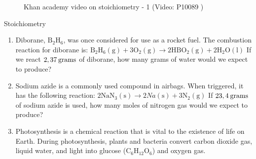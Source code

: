    \noindent
\label{m38712*eip-546}
    \setcounter{subfigure}{0}
	\begin{figure}[H] %
    \textnormal{Khan academy video on stoichiometry - 1}\vspace{.1in} \nopagebreak
  \label{m38712*yt-media4}\label{m38712*yt-video4}
             { (Video:  P10089 )}
      \vspace{2pt}
    \vspace{.1in}
 \end{figure}       \par \label{m38712*secfhsst!!!underscore!!!id2276}
            \begin{exercises}{  Stoichiometry
      }
            \nopagebreak
      \label{m38712*id285393}\begin{enumerate}[noitemsep, label=\textbf{\arabic*}. ] 
            \label{m38712*uid101}\item Diborane, $\mathrm{B}{}_{2}\mathrm{H}{}_{6}$, was once considered for use as a rocket fuel. The combustion reaction for diborane is:
${\mathrm{B}}_{2}{\mathrm{H}}_{6}\left(\mathrm{g}\right)+3{\mathrm{O}}_{2}\left(\mathrm{g}\right)\to 2\mathrm{H}\mathrm{B}{\mathrm{O}}_{2}\left(\mathrm{g}\right)+2{\mathrm{H}}_{2}\mathrm{O}\left(\mathrm{l}\right)$
If we react $2,37\phantom{\rule{2pt}{0ex}}\mathrm{grams}$ of diborane, how many grams of water would we expect to produce?\newline
\label{m38712*uid102}\item Sodium azide is a commonly used compound in airbags. When triggered, it has the following reaction:
$2{\mathrm{NaN}}_{3}\left(\mathrm{s}\right)\to 2Na\left(\mathrm{s}\right)+3{\mathrm{N}}_{2}\left(\mathrm{g}\right)$
If $23,4\phantom{\rule{2pt}{0ex}}\mathrm{grams}$ of sodium azide is used, how many moles of nitrogen gas would we expect to produce?\newline
\label{m38712*uid103}\item Photosynthesis is a chemical reaction that is vital to the existence of life on Earth. During photosynthesis, plants and bacteria convert carbon dioxide gas, liquid water, and light into glucose ($\mathrm{C}{}_{6}\mathrm{H}{}_{12}\mathrm{O}{}_{6}$) and oxygen gas.
\label{m38712*id285674}\begin{enumerate}[noitemsep, label=\textbf{\alph*}. ] 

\end{enumerate}
\end{enumerate}
\end{exercises}
